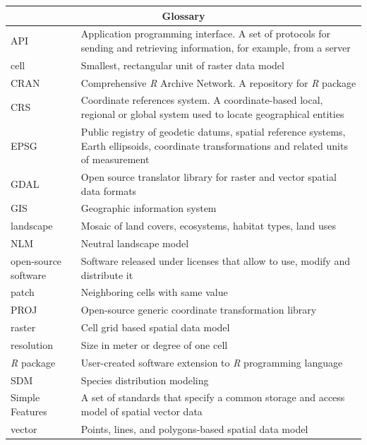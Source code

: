 \documentclass[smallextended]{svjour3}       %
\begin{document}
\begin{table}[H]

\small

\begin{tabularx}{1.15\textwidth}{lX}

\hline

\multicolumn{2}{c}{Glossary} \\

\hline

API & Application programming interface. A set of protocols for sending and retrieving information, for example, from a server \\
cell & Smallest, rectangular unit of raster data model \\
CRAN & Comprehensive \textit{R} Archive Network. A repository for \textit{R} package \\
CRS & Coordinate references system. A coordinate-based local, regional or global system used to locate geographical entities \\
EPSG & Public registry of geodetic datums, spatial reference systems, Earth ellipsoids, coordinate transformations and related units of measurement \\
GDAL & Open source translator library for raster and vector spatial data formats \\
GIS & Geographic information system \\
landscape & Mosaic of land covers, ecosystems, habitat types, land uses \\
NLM & Neutral landscape model \\
open-source software & Software released under licenses that allow to use, modify and distribute it \\
patch & Neighboring cells with same value \\
PROJ & Open-source generic coordinate transformation library \\
raster & Cell grid based spatial data model \\
resolution & Size in meter or degree of one cell \\
\textit{R} package & User-created software extension to \textit{R} programming language \\
SDM & Species distribution modeling \\
Simple Features & A set of standards that specify a common storage and access model of spatial vector data \\
vector & Points, lines, and polygons-based spatial data model \\

\hline

\end{tabularx}
\end{table}
\end{document}
